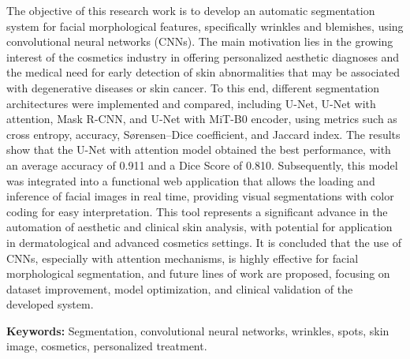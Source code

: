 The objective of this research work is to develop an automatic segmentation system for facial morphological features, specifically wrinkles and blemishes, using convolutional neural networks (CNNs). The main motivation lies in the growing interest of the cosmetics industry in offering personalized aesthetic diagnoses and the medical need for early detection of skin abnormalities that may be associated with degenerative diseases or skin cancer. To this end, different segmentation architectures were implemented and compared, including U-Net, U-Net with attention, Mask R-CNN, and U-Net with MiT-B0 encoder, using metrics such as cross entropy, accuracy, Sørensen–Dice coefficient, and Jaccard index. The results show that the U-Net with attention model obtained the best performance, with an average accuracy of 0.911 and a Dice Score of 0.810. Subsequently, this model was integrated into a functional web application that allows the loading and inference of facial images in real time, providing visual segmentations with color coding for easy interpretation. This tool represents a significant advance in the automation of aesthetic and clinical skin analysis, with potential for application in dermatological and advanced cosmetics settings. It is concluded that the use of CNNs, especially with attention mechanisms, is highly effective for facial morphological segmentation, and future lines of work are proposed, focusing on dataset improvement, model optimization, and clinical validation of the developed system.

\textbf{Keywords:} Segmentation, convolutional neural networks, wrinkles, spots, skin image, cosmetics, personalized treatment.
